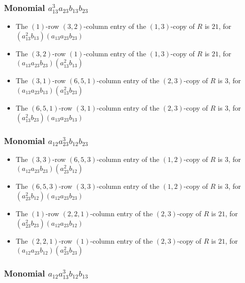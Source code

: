 \documentclass{article}
\begin{document}
\subsubsection{Monomial $ a_{13}^{3} a_{23} b_{13} b_{23} $}

\begin{itemize}
\item The $(1)$-row $(3, 2)$-column entry of the $ \left(1, 3\right) $-copy of $R$ is $ 21 $, for $( a_{13}^{2} b_{13} )( a_{13} a_{23} b_{23} )$ 
\item The $(3, 2)$-row $(1)$-column entry of the $ \left(1, 3\right) $-copy of $R$ is $ 21 $, for $( a_{13} a_{23} b_{23} )( a_{13}^{2} b_{13} )$ 
\item The $(3, 1)$-row $(6, 5, 1)$-column entry of the $ \left(2, 3\right) $-copy of $R$ is $ 3 $, for $( a_{13} a_{23} b_{13} )( a_{13}^{2} b_{23} )$ 
\item The $(6, 5, 1)$-row $(3, 1)$-column entry of the $ \left(2, 3\right) $-copy of $R$ is $ 3 $, for $( a_{13}^{2} b_{23} )( a_{13} a_{23} b_{13} )$ 
\end{itemize}
\subsubsection{Monomial $ a_{12} a_{23}^{3} b_{12} b_{23} $}

\begin{itemize}
\item The $(3, 3)$-row $(6, 5, 3)$-column entry of the $ \left(1, 2\right) $-copy of $R$ is $ 3 $, for $( a_{12} a_{23} b_{23} )( a_{23}^{2} b_{12} )$ 
\item The $(6, 5, 3)$-row $(3, 3)$-column entry of the $ \left(1, 2\right) $-copy of $R$ is $ 3 $, for $( a_{23}^{2} b_{12} )( a_{12} a_{23} b_{23} )$ 
\item The $(1)$-row $(2, 2, 1)$-column entry of the $ \left(2, 3\right) $-copy of $R$ is $ 21 $, for $( a_{23}^{2} b_{23} )( a_{12} a_{23} b_{12} )$ 
\item The $(2, 2, 1)$-row $(1)$-column entry of the $ \left(2, 3\right) $-copy of $R$ is $ 21 $, for $( a_{12} a_{23} b_{12} )( a_{23}^{2} b_{23} )$ 
\end{itemize}
\subsubsection{Monomial $ a_{12} a_{13}^{3} b_{12} b_{13} $}
\end{document}
